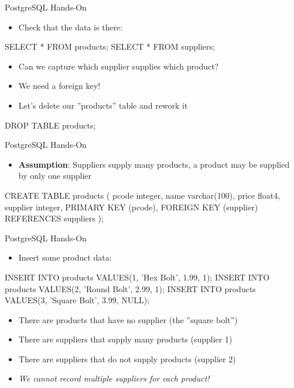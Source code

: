 \documentclass[ignorenonframetext,xcolor=x11names]{beamer}
\begin{document}
\begin{frame}[fragile]{PostgreSQL Hands-On}
\begin{itemize}
  \item Check that the data is there:
\end{itemize}
\footnotesize
\begin{sqlcode}
SELECT * FROM products;
SELECT * FROM suppliers;
\end{sqlcode}
\normalsize
\begin{itemize}
  \item Can we capture which supplier supplies which product?
  \item We need a foreign key!
  \item Let's delete our ''products'' table and rework it
\end{itemize}
\footnotesize
\begin{sqlcode}
DROP TABLE products;
\end{sqlcode}

\end{frame}

\begin{frame}[fragile]{PostgreSQL Hands-On}
\begin{itemize}
  \item \textbf{Assumption}: Suppliers supply many products, a product may be supplied by only one supplier
\end{itemize}
\footnotesize
\begin{sqlcode}
CREATE TABLE products (
  pcode    integer,
  name     varchar(100),
  price    float4,
  supplier integer,
  PRIMARY KEY (pcode),
  FOREIGN KEY (supplier) REFERENCES suppliers );
\end{sqlcode}
\end{frame}

\begin{frame}[fragile]{PostgreSQL Hands-On}
\begin{itemize}
  \item Insert some product data:
\end{itemize}
\footnotesize
\begin{sqlcode}
INSERT INTO products VALUES(1, 'Hex Bolt', 1.99, 1);
INSERT INTO products VALUES(2, 'Round Bolt', 2.99, 1);
INSERT INTO products 
    VALUES(3, 'Square Bolt', 3.99, NULL);
\end{sqlcode}
\normalsize
\begin{itemize}
  \item There are products that have no supplier (the ''square bolt'')
  \item There are suppliers that supply many products (supplier 1)
  \item There are suppliers that do not supply products (supplier 2)
  \item \emph{We cannot record multiple suppliers for each product!}
\end{itemize}
\end{frame}
\end{document}
